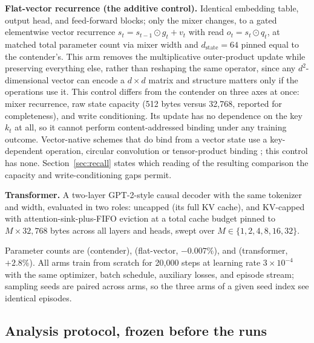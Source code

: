 \textbf{Flat-vector recurrence (the additive control).} Identical
embedding table, output head, and feed-forward blocks; only the mixer
changes, to a gated elementwise vector recurrence
$s_t = s_{t-1} \odot g_t + v_t$ with read $o_t = s_t \odot q_t$, at matched
total parameter count via mixer width and $d_{\mathrm{state}} = 64$ pinned
equal to the contender's. This arm removes the multiplicative
outer-product update while preserving everything else, rather than
reshaping the same operator, since any $d^2$-dimensional vector can encode
a $d \times d$ matrix and structure matters only if the operations use it.
This control differs from the contender on three axes at once: mixer
recurrence, raw state capacity (512 bytes versus 32{,}768,
reported for completeness), and write conditioning. Its update has no
dependence on the key $k_t$ at all, so it cannot perform
content-addressed binding under any training outcome. Vector-native
schemes that do bind from a vector state use a key-dependent operation,
circular convolution \citep{plate1995holographic} or tensor-product
binding \citep{smolensky1990tensor}; this control has none.
Section~\ref{sec:recall} states which reading of the resulting
comparison the capacity and write-conditioning gaps permit.

\textbf{Transformer.} A two-layer GPT-2-style causal decoder with the same
tokenizer and width, evaluated in two roles: uncapped (its full KV cache),
and KV-capped with attention-sink-plus-FIFO eviction
\citep{xiao2023efficient} at a total cache budget pinned to
$M \times 32{,}768$ bytes across all layers and heads, swept over
$M \in \{1, 2, 4, 8, 16, 32\}$. %

Parameter counts are \nparamscontender{} (contender), \nparamsablation{}
(flat-vector, $-0.007\%$), and \nparamstransformer{} (transformer,
$+2.8\%$). %
All arms train from scratch for 20{,}000 steps at learning rate
$3 \times 10^{-4}$ with the same optimizer, batch schedule, auxiliary
losses, and episode stream; sampling seeds are paired across arms, so the
three arms of a given seed index see identical
episodes. %

\subsection{Analysis protocol, frozen before the runs}

